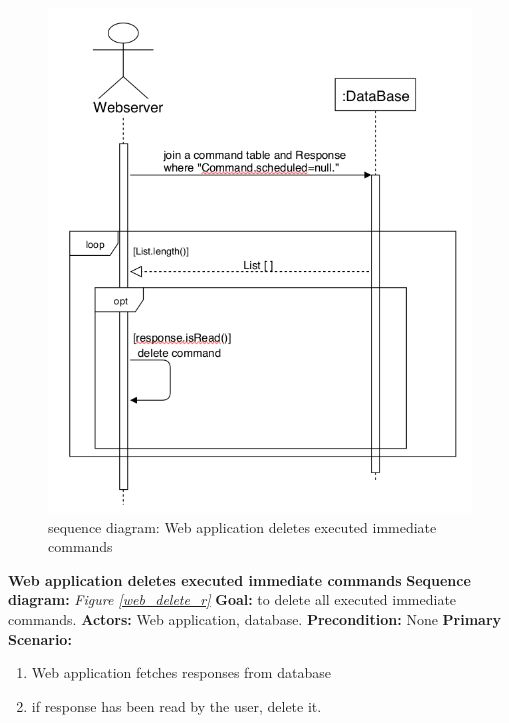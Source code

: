\documentclass[12pt, oneside, a4paper]{book}
\newcommand\boldcolor[1]{\textcolor{bold}{\textbf{#1}}}
\begin{document}
				\begin{figure}[H]
					\includegraphics[width=\linewidth]{img/sequence_w_delete_c.png}
					\caption{sequence diagram: Web application deletes executed immediate commands}
					\label{web_delete_c}
				\end{figure}
				\newpage\hspace*{-6mm}\boldcolor{Web application deletes executed immediate commands}
				\newline\textbf{Sequence diagram:} \textit{Figure \ref{web_delete_r}}
				\newline\textbf{Goal:} to delete all executed immediate commands.
				\newline\textbf{Actors:} Web application, database.
				\newline\textbf{Precondition:} None
				\newline\textbf{Primary Scenario:}	
				\begin{enumerate}[label*=\arabic*.]
					\item Web application fetches responses from database 
					\item if response has been read by the user, delete it.
				\end{enumerate}	
\end{document}
